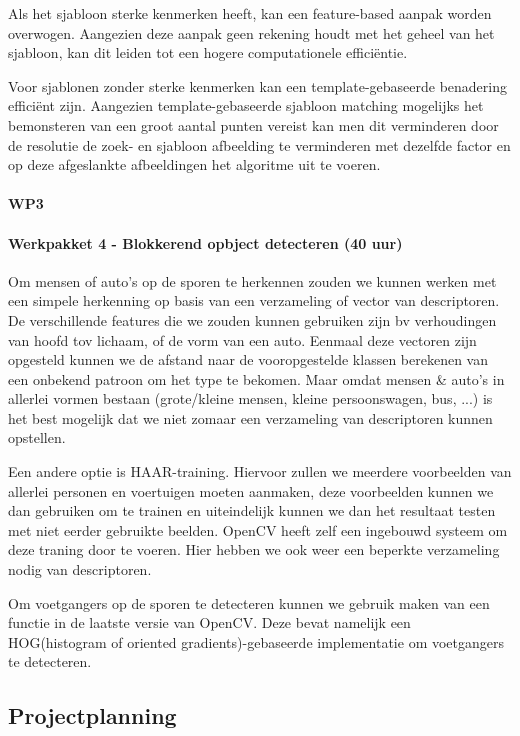 \documentclass[]{book}
\begin{document}
Als het sjabloon sterke kenmerken heeft, kan een feature-based aanpak worden overwogen. Aangezien deze aanpak geen rekening houdt met het geheel van het sjabloon, kan dit leiden tot een hogere computationele efficiëntie.

Voor sjablonen zonder sterke kenmerken kan een template-gebaseerde benadering efficiënt zijn. Aangezien template-gebaseerde sjabloon matching mogelijks het bemonsteren van een groot aantal punten vereist kan men dit verminderen door de resolutie de zoek- en sjabloon afbeelding te verminderen met dezelfde factor en op deze afgeslankte afbeeldingen het algoritme uit te voeren.
\paragraph{WP3}

\paragraph{Werkpakket 4 - Blokkerend opbject detecteren (40 uur)}

Om mensen of auto's op de sporen te herkennen zouden we kunnen werken met een simpele herkenning op basis van een verzameling of vector van descriptoren. De verschillende features die we zouden kunnen gebruiken zijn bv verhoudingen van hoofd tov lichaam, of de vorm van een auto. Eenmaal deze vectoren zijn opgesteld kunnen we de afstand naar de vooropgestelde klassen berekenen van een onbekend patroon om het type te bekomen. Maar omdat mensen \& auto's in allerlei vormen bestaan (grote/kleine mensen, kleine persoonswagen, bus, ...) is het best mogelijk dat we niet zomaar een verzameling van descriptoren kunnen opstellen.

Een andere optie is HAAR-training. Hiervoor zullen we meerdere voorbeelden van allerlei personen en voertuigen moeten aanmaken, deze voorbeelden kunnen we dan gebruiken om te trainen en uiteindelijk kunnen we dan het resultaat testen met niet eerder gebruikte beelden. OpenCV heeft zelf een ingebouwd systeem om deze traning door te voeren. Hier hebben we ook weer een beperkte verzameling nodig van descriptoren.

Om voetgangers op de sporen te detecteren kunnen we gebruik maken van een functie in de laatste versie van OpenCV. Deze bevat namelijk een HOG(histogram of oriented gradients)-gebaseerde implementatie om voetgangers te detecteren.

\subsection{Projectplanning}\label{sec:Projectplanning}
\end{document}
